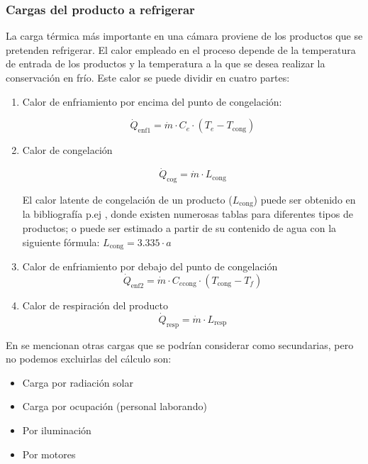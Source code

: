  \subsubsection{Cargas del producto a refrigerar}
 La carga térmica más importante en una cámara proviene de los productos que se pretenden refrigerar. El calor empleado en el proceso depende de la temperatura de entrada de los productos y la temperatura a la que se desea realizar la conservación en frío. Este calor se puede dividir en cuatro partes:
 \begin{enumerate}
 	\item Calor de enfriamiento por encima del punto de congelación:
 	
  
  \begin{equation}
 	\dot{Q}_{\text{enf1}} = \dot{m} \cdot C_e \cdot (T_e - T_{\text{cong}})
 	\label{eq:Calor-de-enfriamiento}
 \end{equation}
 \item Calor de congelación

 \begin{equation}
 	\dot{Q}_{\text{cog}} = \dot{m} \cdot L_{\text{cong}}
 \end{equation}
 
 El calor latente de congelación de un producto ($L_{\text{cong}}$) puede ser obtenido en la bibliografía p.ej \cite{bohn}, donde existen numerosas tablas para diferentes tipos de productos; o puede ser estimado a partir de su contenido de agua con la siguiente fórmula: $L_{\text{cong}} = 3{.}335 \cdot a$
 \item Calor de enfriamiento por debajo del punto de congelación
 \begin{equation}
 	\dot{Q}_{\text{enf2}} = \dot{m} \cdot C_{e\text{cong}} \cdot (T_{\text{cong}} - T_f)
 \end{equation}
 \item Calor de respiración del producto
 \begin{equation}
 	\dot{Q}_{\text{resp}} = \dot{m} \cdot L_{\text{resp}}
 \end{equation}
\end{enumerate}
 
 En  se mencionan otras cargas que se podrían considerar como secundarias, pero no podemos excluirlas del cálculo son:
\begin{itemize}
	\item  Carga por radiación solar
	\item Carga por ocupación (personal laborando)
	\item Por iluminación
	\item  Por motores
	
\end{itemize}

